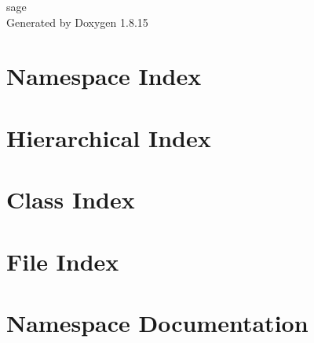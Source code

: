 \let\mypdfximage\pdfximage\def\pdfximage{\immediate\mypdfximage}\documentclass[twoside]{book}
\newcommand{\+}{\discretionary{\mbox{\scriptsize$\hookleftarrow$}}{}{}}
\newcommand{\clearemptydoublepage}{%
  \newpage{\pagestyle{empty}\cleardoublepage}%
}
\begin{document}
\hypersetup{pageanchor=false,
             bookmarksnumbered=true,
             pdfencoding=unicode
            }
\begin{titlepage}
\vspace*{7cm}
\begin{center}%
{\Large sage }\\
\vspace*{1cm}
{\large Generated by Doxygen 1.8.15}\\
\end{center}
\end{titlepage}
\clearemptydoublepage
{}
\tableofcontents
\clearemptydoublepage
{}
\hypersetup{pageanchor=true}

\chapter{Namespace Index}

\chapter{Hierarchical Index}

\chapter{Class Index}

\chapter{File Index}

\chapter{Namespace Documentation}

\end{document}
